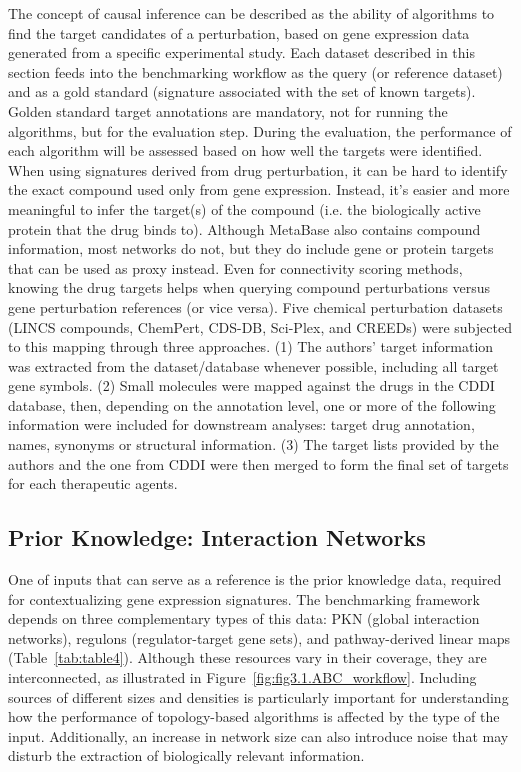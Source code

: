 The concept of causal inference can be described as the ability of algorithms to find the target candidates of a perturbation, based on gene expression data generated from a specific experimental study. 
Each dataset described in this section feeds into the benchmarking workflow as the query (or reference dataset) and as a gold standard (signature associated with the set of known targets). 
Golden standard target annotations are mandatory, not for running the algorithms, but for the evaluation step. 
During the evaluation, the performance of each algorithm will be assessed based on how well the targets were identified. 
When using signatures derived from drug perturbation, it can be hard to identify the exact compound used only from gene expression. 
Instead, it's easier and more meaningful to infer the target(s) of the compound (i.e. the biologically active protein that the drug binds to). 
Although MetaBase also contains compound information, most networks do not, but they do include gene or protein targets that can be used as proxy instead.  
Even for connectivity scoring methods, knowing the drug targets helps when querying compound perturbations versus gene perturbation references (or vice versa). 
Five chemical perturbation datasets (LINCS compounds, ChemPert, CDS-DB, Sci-Plex, and CREEDs) were subjected to this mapping through three approaches. 
(1) The authors' target information was extracted from the dataset/database whenever possible, including all target gene symbols. 
(2) Small molecules were mapped against the drugs in the CDDI database,  then,  depending on the annotation level, one or more of the following information were included for downstream analyses: target drug annotation, names, synonyms or structural information. 
(3) The target lists provided by the authors and the one from \gls{CDDI} were then merged to form the final set of targets for each therapeutic agents.



\subsection{Prior Knowledge: Interaction Networks} %
\label{sec:prior_knowledge_interaction_networks}

One of inputs that can serve as a reference is the prior knowledge data, required for contextualizing gene expression signatures. 
The benchmarking framework depends on three complementary types of this data: \gls{PKN} (global interaction networks), regulons (regulator-target gene sets), and pathway-derived linear maps (Table~\ref{tab:table4}). 
Although these resources vary in their coverage, they are interconnected, as illustrated in Figure~\ref{fig:fig3.1.ABC_workflow}. 
Including sources of different sizes and densities is particularly important for understanding how the performance of topology-based algorithms is affected by the type of the input. 
Additionally, an increase in network size can also introduce noise that may disturb the extraction of biologically relevant information. 

